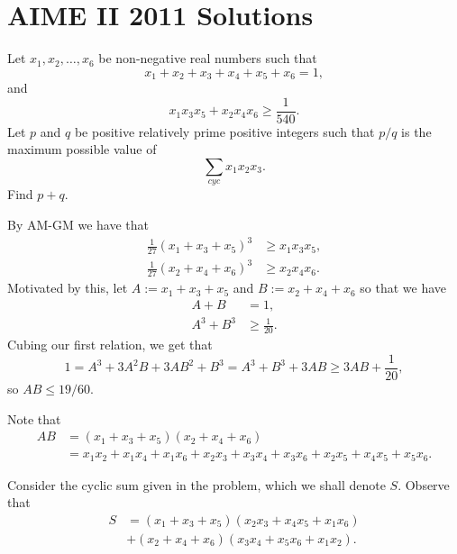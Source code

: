 \documentclass[a5paper, 10pt]{article}
\begin{document}
\section*{AIME II 2011 Solutions}

\begin{chirpbox}
\begin{problem}[\href{https://amctrivial.com/?page=2011_AIME_II_Problems/Problem_9}{2019 AIME II \#9}]
    Let \( x_1, x_2, \ldots, x_6 \) be non-negative real numbers such that
    \[
        x_1 + x_2 + x_3 + x_4 + x_5 + x_6 = 1
    ,\]
    and
    \[
        x_1 x_3 x_5 + x_2 x_4 x_6 \ge \frac{1}{540}
    .\]
    Let \( p \) and \( q \) be positive relatively prime positive integers such that \( p/q \) is the maximum possible value of
    \[
        \sum_{cyc} x_1 x_2 x_3
    .\]
    Find \( p + q \).
\end{problem}
\end{chirpbox}

\begin{solution}
    By AM-GM we have that
    \begin{align*}
        \frac{1}{27}(x_1 + x_3 + x_5)^3 &\ge x_1 x_3 x_5, \\
        \frac{1}{27}(x_2 + x_4 + x_6)^3 &\ge x_2 x_4 x_6
    .\end{align*}
    Motivated by this, let \( A := x_1 + x_3 + x_5 \) and \( B := x_2 + x_4 + x_6 \) so that we have
    \begin{align*}
        A + B &= 1, \\
        A^3 + B^3 &\ge \frac{1}{20}
    .\end{align*}
    Cubing our first relation, we get that
    \[
        1 = A^3 + 3A^2 B + 3A B^2 + B^3 = A^3 + B^3 + 3AB \ge 3AB + \frac{1}{20}
    ,\]
    so \( AB \le 19/60 \).

    Note that
    \begin{align*}
        AB &= (x_1 + x_3 + x_5)(x_2 + x_4 + x_6) \\
        &= x_1 x_2 + x_1 x_4 + x_1 x_6 + x_2 x_3 + x_3 x_4 + x_3 x_6 + x_2 x_5 + x_4 x_5 + x_5 x_6
    .\end{align*}

    Consider the cyclic sum given in the problem, which we shall denote \( S \). Observe that
    \begin{align*}
        S &= (x_1 + x_3 + x_5)(x_2 x_3 + x_4 x_5 + x_1 x_6) \\
        &+ (x_2 + x_4 + x_6) (x_3 x_4 + x_5 x_6 + x_1 x_2)
    .\end{align*}
\end{solution}
\end{document}
